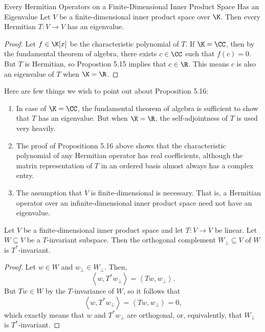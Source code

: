 \documentclass[linearalgebraII]{subfiles}
\begin{document}
    \begin{prop}{Every Hermitian Operators on a Finite-Dimensional Inner Product Space Has an Eigenvalue}
        Let $V$ be a finite-dimensional inner product space over $\K$. Then every Hermitian $T:V\to V$ has an eigenvalue.
    \end{prop}

    \begin{proof}
        Let $f\in\K[x]$ be the characteristic polynomial of $T$. If $\K=\CC$, then by the fundamental theorem of algebra, there exists $c\in\CC$ such that $f(c)=0$. But $T$ is Hermitian, so Propostion 5.15 implies that $c\in\R$. This means $c$ is also an eigenvalue of $T$ when $\K=\R$.
    \end{proof}

    \begin{remark}
        Here are few things we wish to point out about Proposition 5.16:
        \begin{enumerate}
            \item In case of $\K=\CC$, the fundamental theorem of algebra is sufficient to show that $T$ has an eigenvalue. But when $\K=\R$, the self-adjointness of $T$ is used very heavily.
            \item The proof of Propositionn 5.16 above shows that the characteristic polynomial of any Hermitian operator has real coefficients, although the matrix representation of $T$ in an ordered basis almost always has a complex entry.
            \item The assumption that $V$ is finite-dimensional is necessary. That is, a Hermitian operator over an infinite-dimensional inner product space need not have an eigenvalue.
        \end{enumerate}
    \end{remark}

    \begin{prop}{}
        Let $V$ be a finite-dimensional inner product space and let $T:V\to V$ be linear. Let $W\subseteq V$ be a $T$-invariant subspace. Then the orthogonal complement $W_\perp\subseteq V$ of $W$ is $T^*$-invariant.
    \end{prop}

    \begin{proof}
        Let $w\in W$ and $w_\perp\in W_\perp$. Then,
        \begin{equation*}
            \left\langle w, T^*w_\perp\right\rangle = \left\langle Tw, w_\perp\right\rangle .
        \end{equation*}
        But $Tw\in W$ by the $T$-invariance of $W$, so it follows that
        \begin{equation*}
            \left\langle w, T^*w_\perp\right\rangle = \left\langle Tw, w_\perp\right\rangle = 0,
        \end{equation*}
        which exactly means that $w$ and $T^*w_\perp$ are orthogonal, or, equivalently, that $W_\perp$ is $T^*$-invariant.
    \end{proof}
\end{document}
